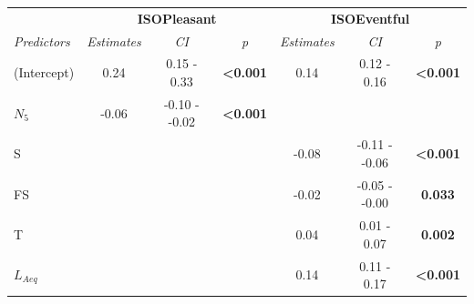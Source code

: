 \begin{table}[h!]
  \def\arraystretch{.5}
  \begin{tabular}{@{}l|lccccc@{}}
    \toprule
    \multicolumn{1}{l|}{}                    &
    \multicolumn{3}{c}{\textbf{ISOPleasant}} &
    \multicolumn{3}{c}{\textbf{ISOEventful}}                                                                                                                                                           \\
    \textit{Predictors}                      &
    \multicolumn{1}{c}{\textit{Estimates}}   &
    \textit{CI}                              &
    \textit{p}                               &
    \textit{Estimates}                       &
    \textit{CI}                              &
    \textit{p}                                                                                                                                                                                         \\ \midrule
    (Intercept)                              &
    \multicolumn{1}{c}{0.24}                 &
    0.15 - 0.33                              &
    \textbf{\textless{}0.001}                &
    0.14                                     &
    0.12 - 0.16                              &
    \textbf{\textless{}0.001}                                                                                                                                                                          \\
    $N_5$                                    & \multicolumn{1}{c}{-0.06}                               & -0.10 - -0.02 & \textbf{\textless{}0.001} &       &               &                           \\
    S                                        & \multicolumn{1}{c}{}                                    &               &                           & -0.08 & -0.11 - -0.06 & \textbf{\textless{}0.001} \\
    FS                                       & \multicolumn{1}{c}{}                                    &               &                           & -0.02 & -0.05 - -0.00 & \textbf{0.033}            \\
    T                                        & \multicolumn{1}{c}{}                                    &               &                           & 0.04  & 0.01 - 0.07   & \textbf{0.002}            \\
    $L_{Aeq}$                                & \multicolumn{1}{c}{}                                    &               &                           & 0.14  & 0.11 - 0.17   & \textbf{\textless{}0.001} \\

\end{tabular}
\end{table}
